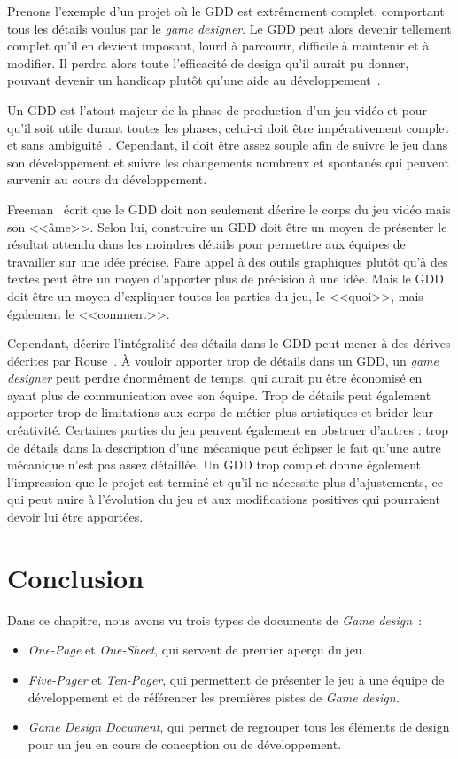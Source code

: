 Prenons l'exemple d'un projet où le GDD est extrêmement complet, comportant tous les détails voulus par le \emph{game designer}.
Le GDD peut alors devenir tellement complet qu'il en devient imposant, lourd à parcourir, difficile à maintenir et à modifier.
Il perdra alors toute l'efficacité de design qu'il aurait pu donner, pouvant devenir un handicap plutôt qu'une aide au développement~\cite{onepage_librande}.

Un GDD est l'atout majeur de la phase de production d'un jeu vidéo et pour qu'il soit utile durant toutes les phases, celui-ci doit être impérativement complet et sans ambiguité~\cite{GD_Guidelines}.
Cependant, il doit être assez souple afin de suivre le jeu dans son développement et suivre les changements nombreux et spontan\'es qui peuvent survenir au cours du développement.

Freeman~\cite{gama_greateGDD} écrit que le GDD doit non seulement décrire le corps du jeu vidéo mais son <<âme>>.
Selon lui, construire un GDD doit être un moyen de présenter le résultat attendu dans les moindres détails pour permettre aux équipes de travailler sur une idée précise.
Faire appel à des outils graphiques plutôt qu'à des textes peut être un moyen d'apporter plus de précision à une idée.
Mais le GDD doit être un moyen d'expliquer toutes les parties du jeu, le <<quoi>>, mais également le <<comment>>.

Cependant, décrire l'intégralité des détails dans le GDD peut mener à des dérives décrites par Rouse~\cite{GD_theory_rouse}.
À vouloir apporter trop de détails dans un GDD, un \emph{game designer} peut perdre énormément de temps, qui aurait pu être économisé en ayant plus de communication avec son équipe.
Trop de détails peut également apporter trop de limitations aux corps de métier plus artistiques et brider leur créativité.
Certaines parties du jeu peuvent également en obstruer d'autres : trop de détails dans la description d'une mécanique peut éclipser le fait qu'une autre mécanique n'est pas assez détaillée.
Un GDD trop complet donne également l'impression que le projet est terminé et qu'il ne nécessite plus d'ajustements, ce qui peut nuire à l'évolution du jeu et aux modifications positives qui pourraient devoir lui être apport\'ees.


\section{Conclusion}
Dans ce chapitre, nous avons vu trois types de documents de \emph{Game design}~: 
\begin{itemize}
    \item \emph{One-Page} et \emph{One-Sheet}, qui servent de premier aperçu du jeu.
    \item \emph{Five-Pager} et \emph{Ten-Pager}, qui permettent de présenter le jeu à une équipe de développement et de référencer les premières pistes de \emph{Game design}.
    \item \emph{Game Design Document}, qui permet de regrouper tous les éléments de design pour un jeu en cours de conception ou de développement.
\end{itemize}



